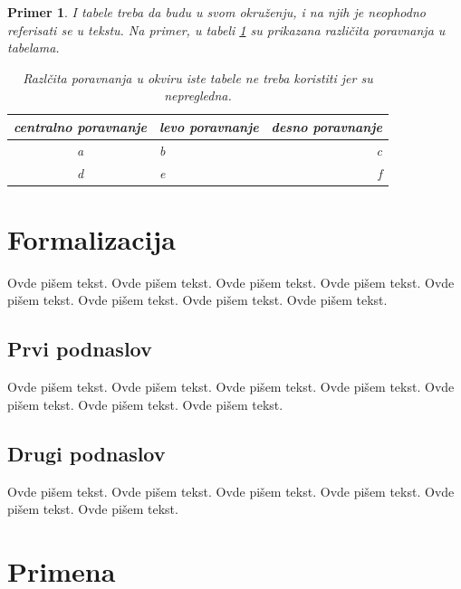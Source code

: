 \documentclass[a4paper]{article}
\newtheorem{primer}{Primer}[section]
\begin{document}
{\begin{primer} I tabele treba da budu u svom okruženju, i na njih je neophodno referisati se u tekstu. Na primer, u tabeli \ref{tab:tabela1} su prikazana različita poravnanja u tabelama.

\begin{table}[h!]
\begin{center}
\caption{Razlčita poravnanja u okviru iste tabele ne treba koristiti jer su nepregledna.}
\begin{tabular}{|c|l|r|} \hline
centralno poravnanje& levo poravnanje& desno poravnanje\\ \hline
a &b&c\\ \hline
d &e&f\\ \hline
\end{tabular}
\label{tab:tabela1}
\end{center}
\end{table}

\end{primer}





\section{Formalizacija}
\label{sec:naslov_formalizacija}


Ovde pišem tekst. 
Ovde pišem tekst. 
Ovde pišem tekst. 
Ovde pišem tekst. 
Ovde pišem tekst. 
Ovde pišem tekst. 
Ovde pišem tekst. 
Ovde pišem tekst. 


\subsection{Prvi podnaslov}
\label{subsec:podnaslov1}

Ovde pišem tekst. 
Ovde pišem tekst. 
Ovde pišem tekst. 
Ovde pišem tekst. 
Ovde pišem tekst. 
Ovde pišem tekst. 
Ovde pišem tekst. 

\subsection{Drugi podnaslov}
\label{subsec:podnaslov2}

Ovde pišem tekst. 
Ovde pišem tekst. 
Ovde pišem tekst. 
Ovde pišem tekst. 
Ovde pišem tekst. 
Ovde pišem tekst. 

\section{Primena}
\label{sec:naslov_primena}

}
\end{document}
